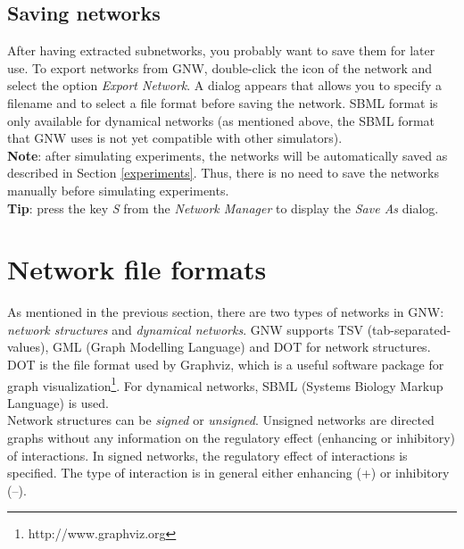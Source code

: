 \documentclass{llncs}
\begin{document}
\subsection{Saving networks}

After having extracted subnetworks, you probably want to save them for later use. To export networks from GNW, double-click the icon of the network and select the option \emph{Export Network}. A dialog appears that allows you to specify a filename and to select a file format before saving the network. SBML format is only available for dynamical networks (as mentioned above, the SBML format that GNW uses is not yet compatible with other simulators).\\

\textbf{Note}: after simulating experiments, the networks will be automatically saved as described in Section \ref{experiments}. Thus, there is no need to save the networks manually before simulating experiments.\\

\textbf{Tip}: press the key \emph{S} from the \emph{Network Manager} to display the \emph{Save As} dialog.



\section{Network file formats}

As mentioned in the previous section, there are two types of networks in GNW: \emph{network structures} and \emph{dynamical networks}. GNW supports TSV (tab-separated-values), GML (Graph Modelling Language) and DOT for network structures. DOT is the file format used by Graphviz, which is a useful software package for graph visualization\footnote{http://www.graphviz.org}. For dynamical networks, SBML (Systems Biology Markup Language) is used.\\

Network structures can be \emph{signed} or \emph{unsigned}. Unsigned networks are directed graphs without any information on the regulatory effect (enhancing or inhibitory) of interactions. In signed networks, the regulatory effect of interactions is specified. The type of interaction is in general either enhancing (+) or inhibitory (--).
\end{document}
